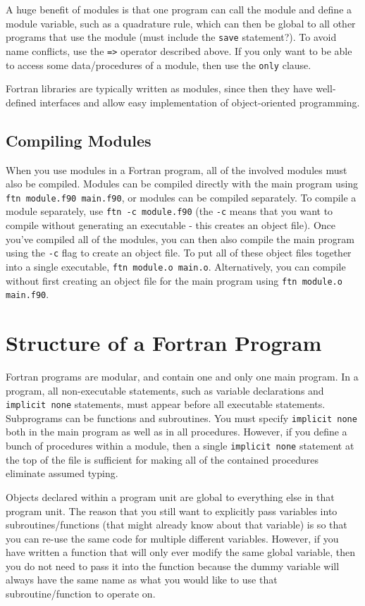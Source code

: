 \documentclass[10pt]{article}
\begin{document}
A huge benefit of modules is that one program can call the module and define a module variable, such as a quadrature rule, which can then be global to all other programs that use the module (must include the {\tt save} statement?). To avoid name conflicts, use the {\tt =>} operator described above. If you only want to be able to access some data/procedures of a module, then use the {\tt only} clause.

Fortran libraries are typically written as modules, since then they have well-defined interfaces and allow easy implementation of object-oriented programming. 


\subsection{Compiling Modules}
When you use modules in a Fortran program, all of the involved modules must also be compiled. Modules can be compiled directly with the main program using {\tt ftn module.f90 main.f90}, or modules can be compiled separately. To compile a module separately, use {\tt ftn -c module.f90} (the {\tt -c} means that you want to compile without generating an executable - this creates an object file). Once you've compiled all of the modules, you can then also compile the main program using the {\tt -c} flag to create an object file. To put all of these object files together into a single executable, {\tt ftn module.o main.o}. Alternatively, you can compile without first creating an object file for the main program using {\tt ftn module.o main.f90}.

\section{Structure of a Fortran Program}
Fortran programs are modular, and contain one and only one main program. In a program, all non-executable statements, such as variable declarations and {\tt implicit none} statements, must appear before all executable statements. Subprograms can be functions and subroutines. You must specify {\tt implicit none} both in the main program as well as in all procedures. However, if you define a bunch of procedures within a module, then a single {\tt implicit none} statement at the top of the file is sufficient for making all of the contained procedures eliminate assumed typing.

Objects declared within a program unit are global to everything else in that program unit. The reason that you still want to explicitly pass variables into subroutines/functions (that might already know about that variable) is so that you can re-use the same code for multiple different variables. However, if you have written a function that will only ever modify the same global variable, then you do not need to pass it into the function because the dummy variable will always have the same name as what you would like to use that subroutine/function to operate on. 
\end{document}

